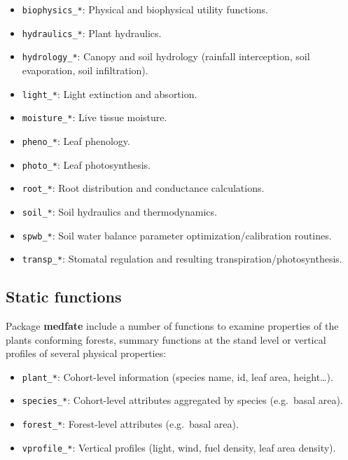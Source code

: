 \documentclass[]{book}
\providecommand{\tightlist}{%
  \setlength{\itemsep}{0pt}\setlength{\parskip}{0pt}}
\begin{document}
\begin{itemize}
\tightlist
\item
  \texttt{biophysics\_*}: Physical and biophysical utility functions.
\item
  \texttt{hydraulics\_*}: Plant hydraulics.
\item
  \texttt{hydrology\_*}: Canopy and soil hydrology (rainfall interception, soil evaporation, soil infiltration).
\item
  \texttt{light\_*}: Light extinction and absortion.
\item
  \texttt{moisture\_*}: Live tissue moisture.
\item
  \texttt{pheno\_*}: Leaf phenology.
\item
  \texttt{photo\_*}: Leaf photosynthesis.
\item
  \texttt{root\_*}: Root distribution and conductance calculations.
\item
  \texttt{soil\_*}: Soil hydraulics and thermodynamics.
\item
  \texttt{spwb\_*}: Soil water balance parameter optimization/calibration routines.
\item
  \texttt{transp\_*}: Stomatal regulation and resulting transpiration/photosynthesis.
\end{itemize}

\hypertarget{static-functions}{%
\subsection{Static functions}\label{static-functions}}

Package \textbf{medfate} include a number of functions to examine properties of the plants conforming forests, summary functions at the stand level or vertical profiles of several physical properties:

\begin{itemize}
\tightlist
\item
  \texttt{plant\_*}: Cohort-level information (species name, id, leaf area, height\ldots{}).
\item
  \texttt{species\_*}: Cohort-level attributes aggregated by species (e.g.~basal area).
\item
  \texttt{forest\_*}: Forest-level attributes (e.g.~basal area).
\item
  \texttt{vprofile\_*}: Vertical profiles (light, wind, fuel density, leaf area density).
\end{itemize}
\end{document}
